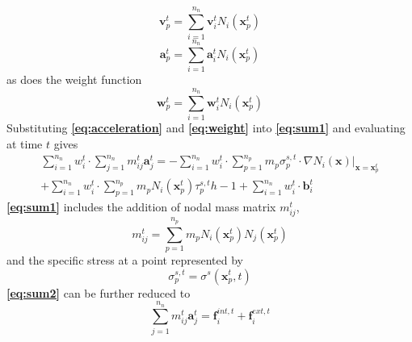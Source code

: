 \begin{equation}
\mathbf{v}_p^t = \sum_{i=1}^{n_n} \mathbf{v}_i^t N_i(\mathbf{x}_p^t)
\label{eq:velocity}
\end{equation}
\begin{equation}
\mathbf{a}_p^t = \sum_{i=1}^{n_n} \mathbf{a}_i^t N_i(\mathbf{x}_p^t)
\label{eq:acceleration}
\end{equation}
as does the weight function
\begin{equation}
\mathbf{w}_p^t = \sum_{i=1}^{n_n} \mathbf{w}_i^t N_i(\mathbf{x}_p^t)
\label{eq:weight}
\end{equation}
Substituting {\bfseries \ref{eq:acceleration}} and {\bfseries \ref{eq:weight}} into {\bfseries \ref{eq:sum1}} and evaluating at time $t$ gives
\begin{equation}
\begin{aligned}
\sum_{i=1}^{n_n}w_i^t \cdot \sum_{j=1}^{n_n}m_{ij}^t \mathbf{a}_j^t = -\sum_{i=1}^{n_n} w_i^t \cdot \sum_{p=1}^{n_p} m_p \sigma_p^{s,t} \cdot \nabla N_i(\mathbf{x}) \rvert_{\mathbf{x} = \mathbf{x}_p^t} \\ + \sum_{i=1}^{n_n}w_i^t \cdot \sum_{p=1}^{n_p} m_p N_i(\mathbf{x}_p^t)\tau_p^{s,t} h-1 + \sum_{i=1}^{n_n}w_i^t \cdot \mathbf{b}_i^t
\label{eq:sum2}
\end{aligned}
\end{equation}
{\bfseries \ref{eq:sum1}} includes the addition of nodal mass matrix $m_{ij}^t$, 
\begin{equation}
m_{ij}^t = \sum_{p=1}^{n_p} m_p N_i(\mathbf{x}_p^t)N_j(\mathbf{x}_p^t)
\label{eq:massmatrix}
\end{equation}
and the specific stress at a point represented by
\begin{equation}
\label{eq:specstress}
\sigma_p^{s,t} = \sigma^s(\mathbf{x}_p^t,t)
\end{equation}
{\bfseries \ref{eq:sum2}} can be further reduced to
\begin{equation}
\label{eq:reduced1}
\sum_{j=1}^{n_n} m_{ij}^t\mathbf{a}_j^t = \mathbf{f}_i^{int,t} + \mathbf{f}_i^{ext,t}
\end{equation}


